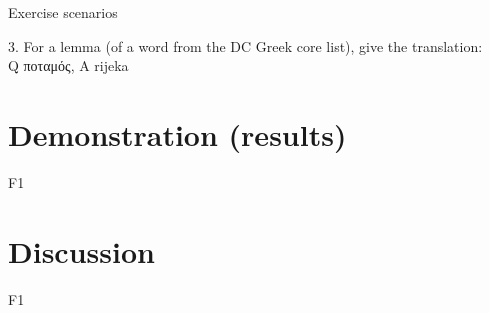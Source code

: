 \documentclass{beamer}
\begin{document}
\begin{frame}{Exercise scenarios}

3. For a lemma (of a word from the DC Greek core list), give the translation:\\
Q ποταμός, A rijeka

\end{frame}

\section{Demonstration (results)}

\begin{frame}{F1}


\end{frame}

\section{Discussion}

\begin{frame}{F1}


\end{frame}



  \maketitle
\end{document}
